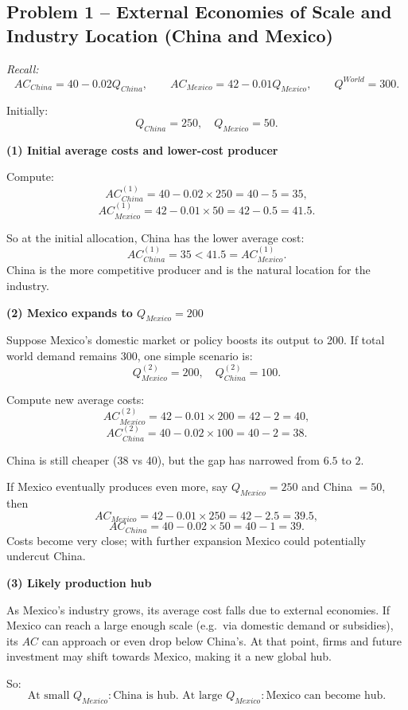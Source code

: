 \documentclass[12pt]{article}
\begin{document}
\vspace{1em}


\subsection*{Problem 1 – External Economies of Scale and Industry Location (China and Mexico)}

\emph{Recall:}
\[
AC_{China} = 40 - 0.02Q_{China}, \qquad
AC_{Mexico} = 42 - 0.01Q_{Mexico}, \qquad
Q^{World} = 300.
\]

Initially:
\[
Q_{China} = 250, \quad Q_{Mexico} = 50.
\]

\textbf{(1) Initial average costs and lower-cost producer}

Compute:
\[
AC_{China}^{(1)} = 40 - 0.02 \times 250 
= 40 - 5 = 35,
\]
\[
AC_{Mexico}^{(1)} = 42 - 0.01 \times 50
= 42 - 0.5 = 41.5.
\]

So at the initial allocation, China has the lower average cost:
\[
AC_{China}^{(1)} = 35 < 41.5 = AC_{Mexico}^{(1)}.
\]
China is the more competitive producer and is the natural location for the industry.

\textbf{(2) Mexico expands to $Q_{Mexico} = 200$}

Suppose Mexico’s domestic market or policy boosts its output to 200. If total world demand remains 300, one simple scenario is:
\[
Q_{Mexico}^{(2)} = 200, \quad Q_{China}^{(2)} = 100.
\]

Compute new average costs:
\[
AC_{Mexico}^{(2)} = 42 - 0.01 \times 200
= 42 - 2 = 40,
\]
\[
AC_{China}^{(2)} = 40 - 0.02 \times 100
= 40 - 2 = 38.
\]

China is still cheaper (38 vs 40), but the gap has narrowed from $6.5$ to $2$.

If Mexico eventually produces even more, say $Q_{Mexico} = 250$ and China $=50$, then
\[
AC_{Mexico} = 42 - 0.01\times 250 = 42 - 2.5 = 39.5,
\]
\[
AC_{China} = 40 - 0.02\times 50 = 40 - 1 = 39.
\]
Costs become very close; with further expansion Mexico could potentially undercut China.

\textbf{(3) Likely production hub}

As Mexico’s industry grows, its average cost falls due to external economies. If Mexico can reach a large enough scale (e.g.\ via domestic demand or subsidies), its $AC$ can approach or even drop below China’s. At that point, firms and future investment may shift towards Mexico, making it a new global hub.

So:
\[
\text{At small }Q_{Mexico}: \text{China is hub. At large }Q_{Mexico}: \text{Mexico can become hub.}
\]
\end{document}
